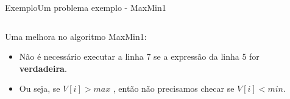\documentclass[aspectratio=169]{beamer}
\begin{document}
\begin{frame}[fragile]{Exemplo}{Um problema exemplo - MaxMin1}
\begin{columns}[T] %
\begin{column}{.5\textwidth}
Uma melhora no algoritmo MaxMin1: 
\begin{itemize}
\item Não é necessário executar a linha 7 se a expressão da linha 5 for {\bf verdadeira}.
\item Ou seja, se $V[i] > max$ , então não precisamos checar se $V[i] < min$.
\end{itemize}
\end{column}%

\hfill%

\begin{column}{.5\textwidth}
\end{column}%
\end{columns}
\end{frame}
	
	
\end{document}
